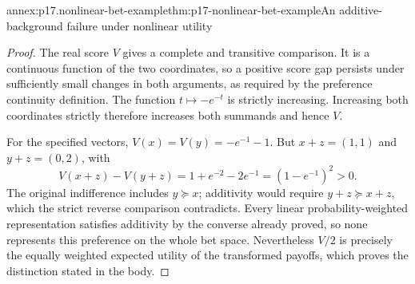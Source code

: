 \begin{annexitem}{annex:p17.nonlinear-bet-example}{thm:p17-nonlinear-bet-example}{An additive-background failure under nonlinear utility}
\begin{proof}
The real score \(V\) gives a complete and transitive comparison.
It is a continuous function of the two coordinates, so a positive
score gap persists under sufficiently small changes in both arguments,
as required by the preference continuity definition. The function
\(t\mapsto-e^{-t}\) is strictly increasing. Increasing both
coordinates strictly therefore increases both summands and hence \(V\).

For the specified vectors,
\(V(x)=V(y)=-e^{-1}-1\). But \(x+z=(1,1)\) and
\(y+z=(0,2)\), with
\[
                  V(x+z)-V(y+z)
                    =1+e^{-2}-2e^{-1}=(1-e^{-1})^2>0.
\]
The original indifference includes \(y\succeq x\); additivity would
require \(y+z\succeq x+z\), which the strict reverse comparison
contradicts. Every linear probability-weighted representation satisfies
additivity by the converse already proved, so none represents this
preference on the whole bet space. Nevertheless \(V/2\) is precisely
the equally weighted expected utility of the transformed payoffs,
which proves the distinction stated in the body.
\end{proof}
\end{annexitem}
